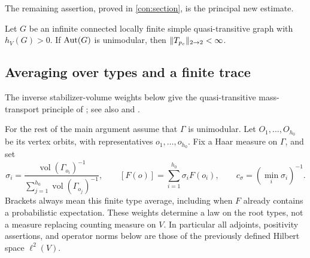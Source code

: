 The remaining assertion, proved in \cref{con:section}, is the principal
new estimate.

\begin{theorem}
\label{thm:critical-operator}
Let $G$ be an infinite connected locally finite simple quasi-transitive
graph with $h_V(G)>0$. If $\operatorname{Aut}(G)$ is unimodular, then
$\lVert T_{{p_c}}\rVert_{2\to2}<\infty$.
\end{theorem}

\subsection{Averaging over types and a finite trace}
\label{pre:types}

The inverse stabilizer-volume weights below give the quasi-transitive
mass-transport principle of \cite[Corollary~3.5]{BLPS1999Invariant}; see
also \cite[Theorem~3.1]{AldousLyons2007} and
\cite[Corollary~8.11 and Section~8.2]{LyonsPeres2016}.

For the rest of the main argument assume that $\Gamma$ is unimodular.
Let $O_1,\ldots,O_{h_0}$ be its vertex orbits, with representatives
$o_1,\ldots,o_{h_0}$. Fix a Haar measure on $\Gamma$, and set
\[
 \sigma_i=
 \frac{\operatorname{vol}(\Gamma_{o_i})^{-1}}
 {\sum_{j=1}^{h_0}\operatorname{vol}(\Gamma_{o_j})^{-1}},
 \qquad [F(o)]=\sum_{i=1}^{h_0}\sigma_iF(o_i),
 \qquad c_\sigma=(\min_i\sigma_i)^{-1}.
\]
Brackets always mean this finite type average, including when $F$
already contains a probabilistic expectation. These weights determine a
law on the root types, not a measure replacing counting measure on $V$.
In particular all adjoints, positivity assertions, and operator norms
below are those of the previously defined Hilbert space $\ell^2(V)$.

